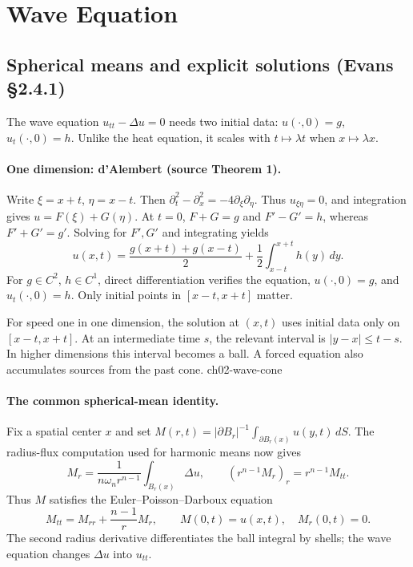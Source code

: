 \section{Wave Equation}
\label{sec:2-4}

\subsection{Spherical means and explicit solutions (Evans \S2.4.1)}
The wave equation $u_{tt}-\Delta u=0$ needs two initial data:
$u(\cdot,0)=g$, $u_t(\cdot,0)=h$.
Unlike the heat equation, it scales with $t\mapsto\lambda t$ when
$x\mapsto\lambda x$.

\paragraph{One dimension: d'Alembert (source Theorem 1).}
Write $\xi=x+t$, $\eta=x-t$. Then
$\partial_t^2-\partial_x^2=-4\partial_\xi\partial_\eta$.
Thus $u_{\xi\eta}=0$, and integration gives $u=F(\xi)+G(\eta)$.
At $t=0$, $F+G=g$ and $F'-G'=h$, whereas $F'+G'=g'$.
Solving for $F',G'$ and integrating yields
\[
 u(x,t)=\frac{g(x+t)+g(x-t)}2
              +\frac12\int_{x-t}^{x+t}h(y)\,dy .
 \tag{DA}
\]
For $g\in C^2$, $h\in C^1$, direct differentiation verifies the equation,
$u(\cdot,0)=g$, and $u_t(\cdot,0)=h$.
Only initial points in $[x-t,x+t]$ matter.

\Needspace{45mm}


{For speed one in one dimension, the solution at $(x,t)$ uses initial data only on $[x-t,x+t]$. At an intermediate time $s$, the relevant interval is $|y-x|\leq t-s$. In higher dimensions this interval becomes a ball. A forced equation also accumulates sources from the past cone.}
{ch02-wave-cone}

\paragraph{The common spherical-mean identity.}
Fix a spatial center $x$ and set
$M(r,t)=|\partial B_r|^{-1}\int_{\partial B_r(x)}u(y,t)\,dS$.
The radius-flux computation used for harmonic means now gives
\[
 M_r=\frac1{n\omega_n r^{n-1}}\int_{B_r(x)}\Delta u,\qquad
 (r^{n-1}M_r)_r=r^{n-1}M_{tt}.
\]
Thus $M$ satisfies the Euler--Poisson--Darboux equation
\[
 M_{tt}=M_{rr}+\frac{n-1}rM_r,\qquad
 M(0,t)=u(x,t),\quad M_r(0,t)=0 .
 \tag{EPD}
\]
The second radius derivative differentiates the ball integral by shells;
the wave equation changes $\Delta u$ into $u_{tt}$.
\Needspace{45mm}

